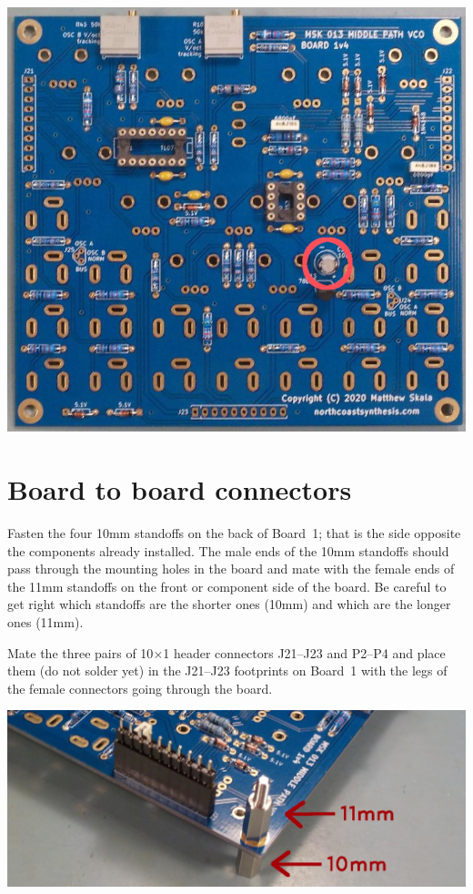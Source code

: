 \nopagebreak
\noindent\includegraphics[width=\linewidth]{cap-10u1.jpg}

\section{Board to board connectors}

Fasten the four 10mm standoffs on the back of Board~1; that is the side
opposite the components already installed.  The male ends of the 10mm
standoffs should pass through the mounting holes in the board and mate with
the female ends of the 11mm standoffs on the front or component side of the
board.  Be careful to get right which standoffs are the shorter ones (10mm)
and which are the longer ones (11mm).

Mate the three pairs of 10$\times$1 header connectors J21--J23 and P2--P4
and place them (do not solder yet) in the J21--J23 footprints on Board~1
with the legs of the female connectors going through the board.

\nopagebreak
\noindent\includegraphics[width=\linewidth]{standoffs.jpg}


